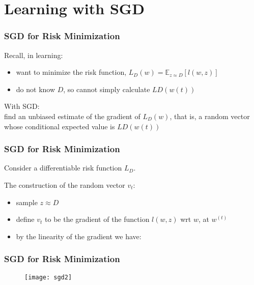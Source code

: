 \section{Learning with SGD}

\begin{frame}
\frametitle{SGD for Risk Minimization}

Recall, in learning:\\
\begin{itemize}
\item want to minimize the risk function, $L_D(w) = \mathbb{E}_{z \approx D} [l(w, z)]$
\item do not know $D$, so cannot simply calculate $LD (w(t))$
\end{itemize}

With SGD:\\
find an unbiased estimate of the gradient of $L_D(w)$, that is,
a random vector whose conditional expected value is $LD (w(t) )$

\end{frame}


\begin{frame}
\frametitle{SGD for Risk Minimization}

Consider a differentiable risk function $L_D$.

The construction of the random vector $v_t$:
\begin{itemize}
\item sample $z \approx D$
\item define $v_t$ to be the gradient of the function $l(w, z)$ wrt $w$, at $w^{(t)}$
\item by the linearity of the gradient we have:
\end{itemize}


\end{frame}


\begin{frame}
\frametitle{SGD for Risk Minimization}

\begin{figure}
    \centering
    \texttt{[image: sgd2]}
\end{figure}

\end{frame}
